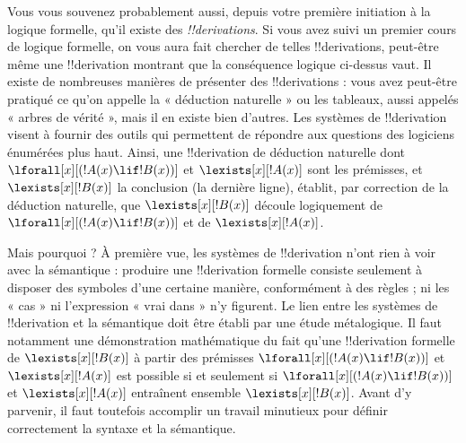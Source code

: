 \documentclass[../../../include/open-logic-section]{subfiles}
\begin{document}
Vous vous souvenez probablement aussi, depuis votre première initiation
à la logique formelle, qu'il existe des \emph{!!{derivation}s}. Si vous
avez suivi un premier cours de logique formelle, on vous aura fait
chercher de telles !!{derivation}s, peut-être même une
!!{derivation} montrant que la conséquence logique ci-dessus vaut. Il
existe de nombreuses manières de présenter des !!{derivation}s : vous
avez peut-être pratiqué ce qu'on appelle la « déduction naturelle » ou
les tableaux, aussi appelés « arbres de vérité », mais il en existe bien d'autres. Les systèmes
de !!{derivation} visent à fournir des outils qui permettent de répondre
aux questions des logiciens énumérées plus haut. Ainsi, une
!!{derivation} de déduction naturelle dont
$\lforall[x][(!A(x) \lif !B(x))]$ et $\lexists[x][!A(x)]$ sont les
prémisses, et $\lexists[x][!B(x)]$ la conclusion (la dernière ligne),
établit, par correction de la déduction naturelle, que
$\lexists[x][!B(x)]$ découle logiquement de
$\lforall[x][(!A(x) \lif !B(x))]$ et de $\lexists[x][!A(x)]$.

Mais pourquoi ? À première vue, les systèmes de !!{derivation} n'ont
rien à voir avec la sémantique : produire une !!{derivation} formelle
consiste seulement à disposer des symboles d'une certaine manière,
conformément à des règles ; ni les « cas » ni l'expression « vrai dans »
n'y figurent. Le lien entre les systèmes de !!{derivation} et la
sémantique doit être établi par une étude métalogique. Il faut notamment
une démonstration mathématique du fait qu'une !!{derivation} formelle de
$\lexists[x][!B(x)]$ à partir des prémisses
$\lforall[x][(!A(x) \lif !B(x))]$ et $\lexists[x][!A(x)]$ est possible
si et seulement si $\lforall[x][(!A(x) \lif !B(x))]$ et
$\lexists[x][!A(x)]$ entraînent ensemble $\lexists[x][!B(x)]$. Avant
d'y parvenir, il faut toutefois accomplir un travail minutieux pour
définir correctement la syntaxe et la sémantique.
\end{document}
